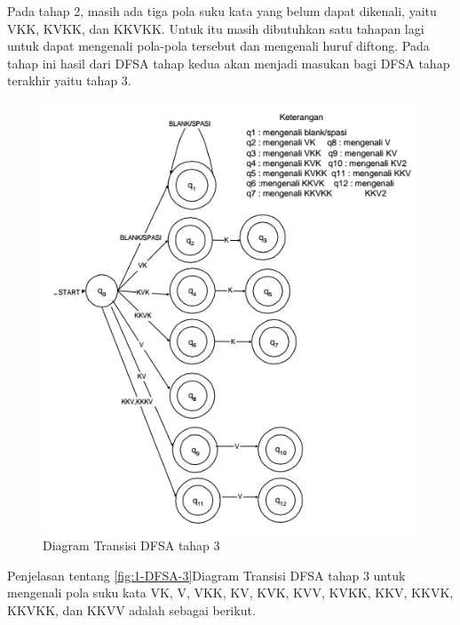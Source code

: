 Pada tahap 2, masih ada tiga pola suku kata yang belum dapat dikenali, yaitu VKK, KVKK, dan KKVKK. Untuk itu masih dibutuhkan satu tahapan lagi untuk dapat mengenali pola-pola tersebut dan mengenali huruf diftong. Pada tahap ini hasil dari DFSA tahap kedua akan menjadi masukan bagi DFSA tahap terakhir yaitu tahap 3.

\begin{figure}[H]
	\centering
	\includegraphics[scale=1.3]{Gambar/DFSA-3}
	\caption{Diagram Transisi DFSA tahap 3\cite{Thomas:2000}} 
	\label{fig:3-DFSA-3}
\end{figure}

Penjelasan tentang \ref{fig:1-DFSA-3}Diagram Transisi DFSA tahap 3 untuk mengenali pola suku kata VK, V, VKK, KV, KVK, KVV, KVKK, KKV, KKVK, KKVKK, dan KKVV adalah sebagai berikut.

